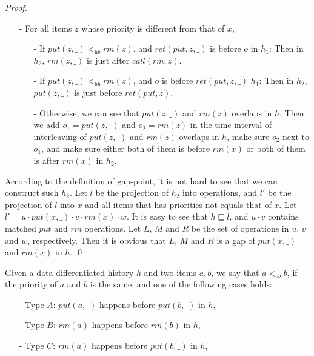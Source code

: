 \begin {proof}
\begin{itemize}
\item[-] For all items $z$ whose priority is different from that of $x$,

    \begin{itemize}
    \setlength{\itemsep}{0.5pt}

    \item[-] If $\textit{put}(z,\_) <_{\textit{hb}} \textit{rm}(z)$, and $\textit{ret}(\textit{put},z,\_)$ is before $o$ in $h_1$: Then in $h_2$, $\textit{rm}(z,\_)$ is just after $\textit{call}(\textit{rm},z)$.

    \item[-] If $\textit{put}(z,\_) <_{\textit{hb}} \textit{rm}(z)$, and $o$ is before $\textit{ret}(\textit{put},z,\_)$ $h_1$: Then in $h_2$, $\textit{put}(z,\_)$ is just before $\textit{ret}(\textit{put},z)$.

    \item[-] Otherwise, we can see that $\textit{put}(z,\_)$ and $\textit{rm}(z)$ overlaps in $h$. Then we add $o_1=\textit{put}(z,\_)$ and $o_2=\textit{rm}(z)$ in the time interval of interleaving of $\textit{put}(z,\_)$ and $\textit{rm}(z)$ overlaps in $h$, make sure $o_2$ next to $o_1$, and make sure either both of them is before $\textit{rm}(x)$ or both of them is after $\textit{rm}(x)$ in $h_2$.
    \end{itemize}
\end{itemize}

According to the definition of gap-point, it is not hard to see that we can construct such $h_2$. Let $l$ be the projection of $h_2$ into operations, and $l'$ be the projection of $l$ into $x$ and all items that has priorities not equals that of $x$. Let $l'= u \cdot \textit{put}(x,\_) \cdot v \cdot \textit{rm}(x) \cdot w$. It is easy to see that $h \sqsubseteq l$, and $u \cdot v$ contains matched $\textit{put}$ and $\textit{rm}$ operations. Let $L$, $M$ and $R$ be the set of operations in $u$, $v$ and $w$, respectively. Then it is obvious that $L$, $M$ and $R$ is a gap of $\textit{put}(x,\_)$ and $\textit{rm}(x)$ in $h$. \qed
\end {proof}

Given a data-differentiated history $h$ and two items $a,b$, we say that $a <_{\textit{ob}} b$, if the priority of $a$ and $b$ is the same, and one of the following cases holds:

\begin{itemize}
\setlength{\itemsep}{0.5pt}
\item[-] Type $A$: $\textit{put}(a,\_)$ happens before $\textit{put}(b,\_)$ in $h$,

\item[-] Type $B$: $\textit{rm}(a)$ happens before $\textit{rm}(b)$ in $h$,

\item[-] Type $C$: $\textit{rm}(a)$ happens before $\textit{put}(b,\_)$ in $h$,
\end{itemize}


